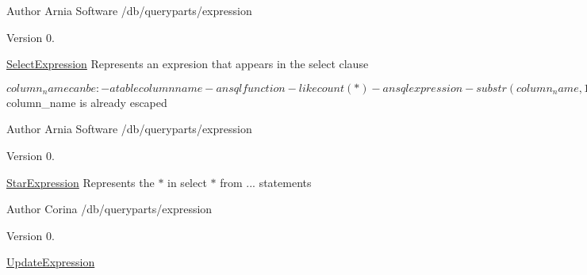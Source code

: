 \begin{DoxyAuthor}{Author}
Arnia Software /db/queryparts/expression 
\end{DoxyAuthor}
\begin{DoxyVersion}{Version}
0.
\end{DoxyVersion}
\hyperlink{classSelectExpression}{Select\+Expression} Represents an expresion that appears in the select clause \begin{DoxyVerb}    $column_name can be:
    - a table column name
    - an sql function - like count(*)
        - an sql expression - substr(column_name, 1, 8) or score1 + score2
    $column_name is already escaped
\end{DoxyVerb}


\begin{DoxyAuthor}{Author}
Arnia Software /db/queryparts/expression 
\end{DoxyAuthor}
\begin{DoxyVersion}{Version}
0.
\end{DoxyVersion}
\hyperlink{classStarExpression}{Star\+Expression} Represents the $\ast$ in \textquotesingle{}select $\ast$ from ...\textquotesingle{} statements

\begin{DoxyAuthor}{Author}
Corina /db/queryparts/expression 
\end{DoxyAuthor}
\begin{DoxyVersion}{Version}
0.
\end{DoxyVersion}
\hyperlink{classUpdateExpression}{Update\+Expression}

